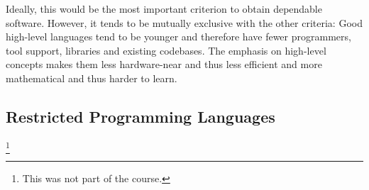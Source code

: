 Ideally, this would be the most important criterion to obtain dependable software.
However, it tends to be mutually exclusive with the other criteria:
Good high-level languages tend to be younger and therefore have fewer programmers, tool support, libraries and existing codebases.
The emphasis on high-level concepts makes them less hardware-near and thus less efficient and more mathematical and thus harder to learn.

\subsection{Restricted Programming Languages}

\footnote{This was not part of the course.}